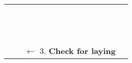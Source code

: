 \begin{table}[H]
\begin{center}
\begin{tabular}{>{\stepcounter{rowno}\therowno}lllcc}
\\
\\
\\
\\
\\
\\
\\
\\
\\
\\
\\
\\
\\
\\ 
 & & \multicolumn{2}{l}{$\leftarrow$  3. \textbf{Check for laying}}
\end{tabular}
\end{center}
\end{table}